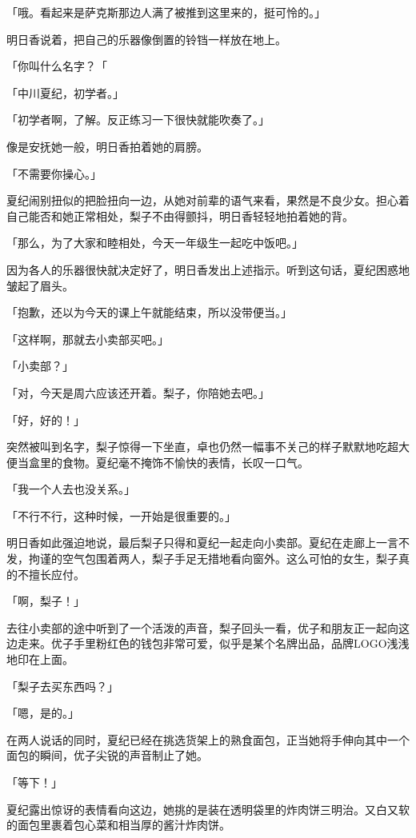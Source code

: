 \documentclass[UTF8]{ctexart}
\begin{document}
    「哦。看起来是萨克斯那边人满了被推到这里来的，挺可怜的。」

    明日香说着，把自己的乐器像倒置的铃铛一样放在地上。

    「你叫什么名字？「

    「中川夏纪，初学者。」

    「初学者啊，了解。反正练习一下很快就能吹奏了。」

    像是安抚她一般，明日香拍着她的肩膀。

    「不需要你操心。」

    夏纪闹别扭似的把脸扭向一边，从她对前辈的语气来看，果然是不良少女。担心着自己能否和她正常相处，梨子不由得颤抖，明日香轻轻地拍着她的背。

    「那么，为了大家和睦相处，今天一年级生一起吃中饭吧。」

    因为各人的乐器很快就决定好了，明日香发出上述指示。听到这句话，夏纪困惑地皱起了眉头。

    「抱歉，还以为今天的课上午就能结束，所以没带便当。」

    「这样啊，那就去小卖部买吧。」

    「小卖部？」

    「对，今天是周六应该还开着。梨子，你陪她去吧。」

    「好，好的！」

    突然被叫到名字，梨子惊得一下坐直，卓也仍然一幅事不关己的样子默默地吃超大便当盒里的食物。夏纪毫不掩饰不愉快的表情，长叹一口气。

    「我一个人去也没关系。」

    「不行不行，这种时候，一开始是很重要的。」

    明日香如此强迫地说，最后梨子只得和夏纪一起走向小卖部。夏纪在走廊上一言不发，拘谨的空气包围着两人，梨子手足无措地看向窗外。这么可怕的女生，梨子真的不擅长应付。

    「啊，梨子！」

    去往小卖部的途中听到了一个活泼的声音，梨子回头一看，优子和朋友正一起向这边走来。优子手里粉红色的钱包非常可爱，似乎是某个名牌出品，品牌LOGO浅浅地印在上面。

    「梨子去买东西吗？」

    「嗯，是的。」

    在两人说话的同时，夏纪已经在挑选货架上的熟食面包，正当她将手伸向其中一个面包的瞬间，优子尖锐的声音制止了她。

    「等下！」

    夏纪露出惊讶的表情看向这边，她挑的是装在透明袋里的炸肉饼三明治。又白又软的面包里裹着包心菜和相当厚的酱汁炸肉饼。
\end{document}
